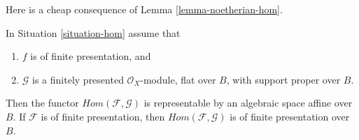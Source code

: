 \noindent
Here is a cheap consequence of Lemma \ref{lemma-noetherian-hom}.

\begin{proposition}
\label{proposition-hom}
In Situation \ref{situation-hom} assume that
\begin{enumerate}
\item $f$ is of finite presentation, and
\item $\mathcal{G}$ is a finitely presented $\mathcal{O}_X$-module,
flat over $B$, with support proper over $B$.
\end{enumerate}
Then the functor $\mathit{Hom}(\mathcal{F}, \mathcal{G})$ is
representable by an algebraic space affine over $B$. If $\mathcal{F}$
is of finite presentation, then $\mathit{Hom}(\mathcal{F}, \mathcal{G})$
is of finite presentation over $B$.
\end{proposition}

